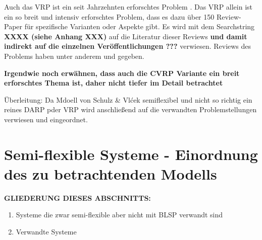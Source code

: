 Auch das VRP ist ein seit Jahrzehnten erforschtes Problem \parencite{orloff_fundamental_1974}. Das VRP allein ist ein so breit und intensiv erforschtes Problem, dass es dazu über 150 Review-Paper für spezifische Varianten oder Aspekte gibt. Es wird mit dem Searchstring \textbf{XXXX (siehe Anhang XXX)} auf die Literatur dieser Reviews \textbf{und damit indirekt auf die einzelnen Veröffentlichungen ???} verwiesen. Reviews des Problems haben unter anderem \textcite{braekers_vehicle_2016} und \textcite{vidal_concise_2020} gegeben. 

\textbf{Irgendwie noch erwähnen, dass auch die CVRP Variante ein breit erforschtes Thema ist, daher nicht tiefer im Detail betrachtet}

Überleitung: Da Mdoell von Schulz \& Vlćek semiflexibel und nicht so richtig ein reines DARP pder VRP wird anschließend auf die verwandten Problemstellungen verwiesen und eingeordnet.

\newpage
\section{Semi-flexible Systeme - Einordnung des zu betrachtenden Modells}
\label{sec:Einordnung}
\label{sec:2.2}

\textbf{GLIEDERUNG DIESES ABSCHNITTS:}
\begin{enumerate}
    \item Systeme die zwar semi-flexible aber nicht mit BLSP verwandt sind
    \item Verwandte Systeme
\end{enumerate}


